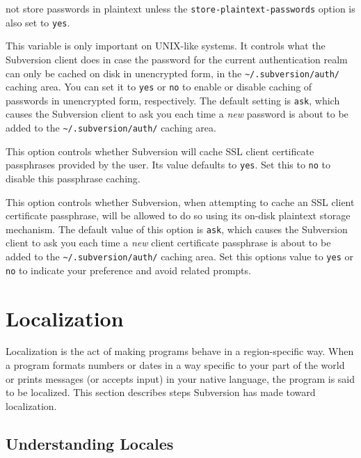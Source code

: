 \begin{description}
not store passwords in plaintext unless the
\texttt{store-plaintext-passwords} option is also set to \texttt{yes}.
\item[\texttt{store-plaintext-passwords}]
This variable is only important on UNIX-like systems. It controls what
the Subversion client does in case the password for the current
authentication realm can only be cached on disk in unencrypted form, in
the \texttt{\textasciitilde{}/.subversion/auth/} caching area. You can
set it to \texttt{yes} or \texttt{no} to enable or disable caching of
passwords in unencrypted form, respectively. The default setting is
\texttt{ask}, which causes the Subversion client to ask you each time a
\emph{new} password is about to be added to the
\texttt{\textasciitilde{}/.subversion/auth/} caching area.
\item[\texttt{store-ssl-client-cert-pp}]
This option controls whether Subversion will cache SSL client
certificate passphrases provided by the user. Its value defaults to
\texttt{yes}. Set this to \texttt{no} to disable this passphrase
caching.
\item[\texttt{store-ssl-client-cert-pp-plaintext}]
This option controls whether Subversion, when attempting to cache an SSL
client certificate passphrase, will be allowed to do so using its
on-disk plaintext storage mechanism. The default value of this option is
\texttt{ask}, which causes the Subversion client to ask you each time a
\emph{new} client certificate passphrase is about to be added to the
\texttt{\textasciitilde{}/.subversion/auth/} caching area. Set this
option\textquotesingle s value to \texttt{yes} or \texttt{no} to
indicate your preference and avoid related prompts.
\end{description}

\section{Localization}\label{svn.advanced.l10n}

Localization is the act of making programs behave in a region-specific
way. When a program formats numbers or dates in a way specific to your
part of the world or prints messages (or accepts input) in your native
language, the program is said to be localized. This section describes
steps Subversion has made toward localization.

\subsection{Understanding
Locales}\label{svn.advanced.l10n.understanding}

